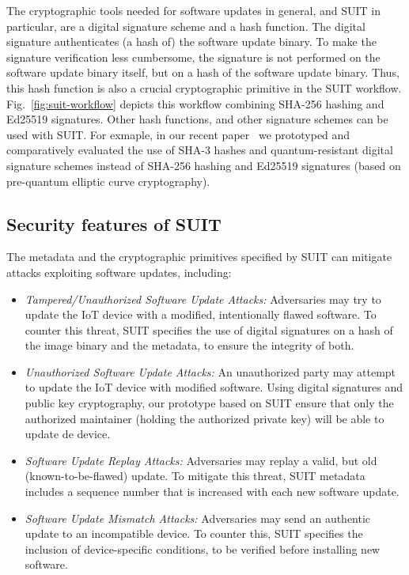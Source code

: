 \documentclass[../main.tex]{subfiles}
\begin{document}
The cryptographic tools needed for software updates in general,
and SUIT in particular,
are a digital signature scheme and a hash function.
The digital signature authenticates (a hash of) the software update binary.
To make the signature verification less cumbersome, the signature is not performed on the
software update binary itself, but on a hash of the software update binary.
Thus, this hash function is also a crucial cryptographic primitive in the SUIT workflow.
Fig.~\ref{fig:suit-workflow} depicts this workflow combining SHA-256 hashing and Ed25519 signatures.
Other hash functions, and other signature schemes can be used with SUIT.
For exmaple, in our recent paper~\cite{Banegas2022quantum-suit} we prototyped and comparatively evaluated the use of SHA-3 hashes and quantum-resistant digital signature schemes instead of SHA-256 hashing and Ed25519 signatures (based on pre-quantum elliptic curve cryptography).


\subsection{Security features of SUIT}
The metadata and the cryptographic primitives specified by SUIT can
mitigate attacks exploiting software updates, including:

\begin{itemize}
    \item \emph{Tampered/Unauthorized Software Update Attacks:}
        Adversaries may try to update the IoT device with a modified, intentionally flawed software.
        To counter this threat, SUIT specifies the use of digital signatures
        on a hash of the image binary and the metadata, to ensure the
        integrity of both.
        \item \emph{Unauthorized Software Update Attacks:} An unauthorized party may attempt to update the IoT device with modified software. Using digital signatures and public key cryptography, our prototype based on SUIT ensure that only the authorized maintainer (holding the authorized private key) will be able to update de device.
    \item \emph{Software Update Replay Attacks:}
        Adversaries may replay a valid, but old (known-to-be-flawed) update.
        To mitigate this threat, SUIT metadata includes
        a sequence number that is increased with each new software update.
    \item \emph{Software Update Mismatch Attacks:}
        Adversaries may send an authentic update
        to an incompatible device. To counter this,
        SUIT specifies the inclusion of device-specific
        conditions, to be verified before installing new software.
\end{itemize}
	
	





	
\end{document}
